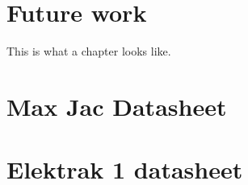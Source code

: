 \documentclass[a4paper,11pt]{kth-mag}
\begin{document}
\chapter{Future work}
This is what a chapter looks like.


\glsaddall
\appendix
\addappheadtotoc
\chapter{Max Jac Datasheet}
\label{appendix:Max_Jac}

\chapter{Elektrak 1 datasheet}
\label{appendix:Electrak_1}

\end{document}

